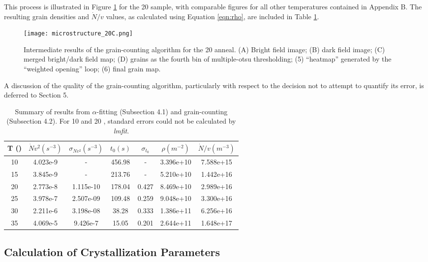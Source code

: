 This process is illustrated in Figure \ref{fig:algo_ex} for the 20  sample, with comparable figures for all other temperatures contained in Appendix B.  The resulting grain densities and $\dot{N}/v$ values, as calculated using Equation \ref{eqn:rho}, are included in Table \ref{table:data_results}.

	\begin{figure}[h]
		\centering
		\texttt{[image: microstructure\_20C.png]}
		\caption{Intermediate results of the grain-counting algorithm for the 20  anneal. (A) Bright field image; (B) dark field image; (C) merged bright/dark field map; (D) grains as the fourth bin of multiple-otsu thresholding; (5) ``heatmap'' generated by the ``weighted opening'' loop; (6) final grain map.}
		\label{fig:algo_ex}
	\end{figure}

A discussion of the quality of the grain-counting algorithm, particularly with respect to the decision not to attempt to quantify its error, is deferred to Section 5.

	\begin{table}[h!]
	\centering
	\begin{tabular}{|c c c c c c c|} 
	\hline
		T (\textdegree{C}) & $\dot{N}v^2 (s^{-3})$ & $\sigma_{\dot{N}v^2}(s^{-3})$ & $t_0 (s)$ & $\sigma_{t_0}$ & $\rho (m^{-2})$ & $\dot{N}/v (m^{-3})$ \\ 
	\hline
		10 & 4.023e-9 & - & 456.98 & - & 3.396e+10 & 7.588e+15\\ 
		15 & 3.845e-9 & - & 213.76 & - & 5.210e+10 & 1.442e+16\\
		20 & 2.773e-8 & 1.115e-10 & 178.04 & 0.427 & 8.469e+10 & 2.989e+16\\
		25 & 3.978e-7 & 2.507e-09 & 109.48 & 0.259 & 9.048e+10 & 3.300e+16\\
		30 & 2.211e-6 & 3.198e-08 & 38.28 & 0.333 & 1.386e+11 & 6.256e+16\\
		35 & 4.069e-5 & 9.426e-7 & 15.05 & 0.201 & 2.644e+11 & 1.648e+17\\
	\hline
	\end{tabular}
		\caption{Summary of results from $\alpha$-fitting (Subsection 4.1) and grain-counting (Subsection 4.2).  For 10  and 20 , standard errors could not be calculated by \textit{lmfit}.}
	\label{table:data_results}
	\end{table}

\subsection{Calculation of Crystallization Parameters}


